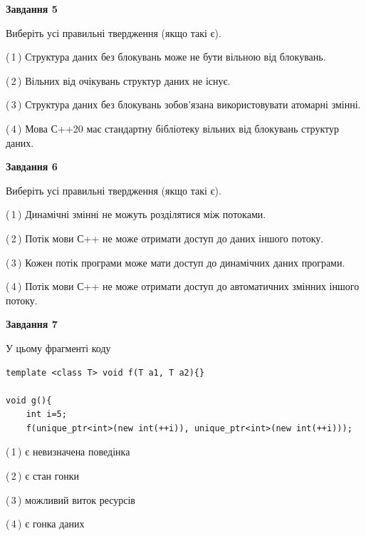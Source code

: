 \documentclass[12pt, ukrainian]{article}
\begin{document}
\begin {large}
{\begin{center}
\textbf{Завдання 5}
\end{center}

Виберіть усі правильні твердження (якщо такі є).\par
\vspace{2mm}

(\,1\,) Структура даних без блокувань може не бути вільною від блокувань.%

(\,2\,) Вільних від очікувань структур даних не існує.%

(\,3\,) Структура даних без блокувань зобов’язана використовувати атомарні змінні.%

(\,4\,) Мова С++20 має стандартну бібліотеку вільних від блокувань структур даних.%
\newpage


\begin{center}
\textbf{Завдання 6}
\end{center}

Виберіть усі правильні твердження (якщо такі є).\par
\vspace{2mm}

(\,1\,) Динамічні змінні не можуть розділятися між потоками.%

(\,2\,) Потік мови С++ не може отримати доступ до даних іншого потоку.%

(\,3\,) Кожен потік програми може мати доступ до динамічних даних програми.%

(\,4\,) Потік мови С++ не може отримати доступ до автоматичних змінних іншого потоку.%


\begin{center}
\textbf{Завдання 7}
\end{center}

У цьому фрагменті коду
\begin{verbatim}
template <class T> void f(T a1, T a2){}

void g(){
    int i=5;
    f(unique_ptr<int>(new int(++i)), unique_ptr<int>(new int(++i)));
\end{verbatim}

(\,1\,) є невизначена поведінка%

(\,2\,) є стан гонки%

(\,3\,) можливий виток ресурсів%

(\,4\,) є гонка даних%

}
\end {large}

\vspace{4mm}
\newpage
\end{document}
